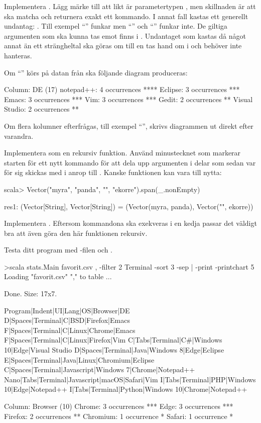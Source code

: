 \Subtask Implementera . Lägg märke till att likt  är parametertypen , men skillnaden är att  ska matcha och returnera exakt ett kommando. I annat fall kastas ett generellt undantag: . Till exempel ``'' funkar men ``'' och ``'' funkar inte. De giltiga argumenten som ska kunna tas emot finns i . Undantaget som kastas då något annat än ett strängheltal ska göras om till en  tas hand om i  och behöver inte hanteras.

Om ``'' körs på datan från  ska följande diagram produceras:
\begin{REPLnonum}
Column: DE (17)
notepad++: 4 occurrences
****
Eclipse: 3 occurrences
***
Emacs: 3 occurrences
***
Vim: 3 occurrences
***
Gedit: 2 occurrences
**
Visual Studio: 2 occurrences
**

\end{REPLnonum}
Om flera kolumner efterfrågas, till exempel ``'', skrivs diagrammen ut direkt efter varandra.

\Subtask Implementera  som en rekursiv funktion. Använd minustecknet som markerar starten för ett nytt kommando för att dela upp argumenten  i delar som sedan var för sig skickas med i anrop till . Kanske funktionen  kan vara till nytta:
\begin{REPLnonum}
scala> Vector("myra", "panda", "", "ekorre").span(_.nonEmpty)

res1: (Vector[String], Vector[String]) = (Vector(myra, panda),
                                         Vector("", ekorre))
\end{REPLnonum}

\Subtask Implementera . Eftersom kommandona ska exekveras i en kedja passar det väldigt bra att även göra den här funktionen rekursiv.

\Subtask Testa ditt program med -filen och .
\begin{REPLnonum}
>scala stats.Main favorit.csv , -filter 2 Terminal -sort 3 -sep | -print
-printchart 5
Loading "favorit.csv" "," to table ...

Done. Size: 17x7.

Program|Indent|UI|Lang|OS|Browser|DE
D|Spaces|Terminal|C|BSD|Firefox|Emacs
F|Spaces|Terminal|C|Linux|Chrome|Emacs
F|Spaces|Terminal|C|Linux|Firefox|Vim
C|Tabs|Terminal|C#|Windows 10|Edge|Visual Studio
D|Spaces|Terminal|Java|Windows 8|Edge|Eclipse
E|Spaces|Terminal|Java|Linux|Chromium|Eclipse
C|Spaces|Terminal|Javascript|Windows 7|Chrome|Notepad++
Nano|Tabs|Terminal|Javascript|macOS|Safari|Vim
I|Tabs|Terminal|PHP|Windows 10|Edge|Notepad++
I|Tabs|Terminal|Python|Windows 10|Chrome|Notepad++

Column: Browser (10)
Chrome: 3 occurrences
***
Edge: 3 occurrences
***
Firefox: 2 occurrences
**
Chromium: 1 occurrence
*
Safari: 1 occurrence
*

\end{REPLnonum}


